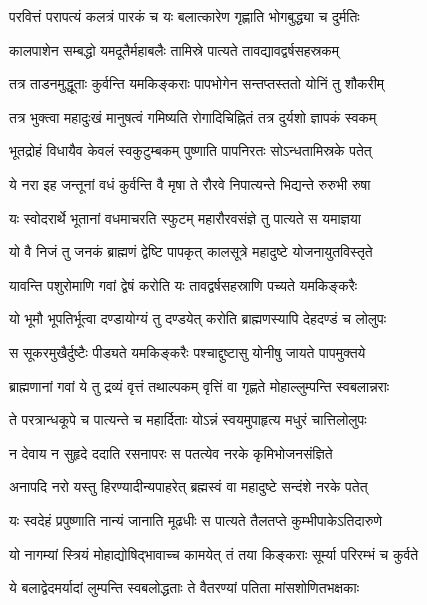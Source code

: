 \twolineshloka
{परवित्तं परापत्यं कलत्रं पारकं च यः}
{बलात्कारेण गृह्णाति भोगबुद्ध्या च दुर्मतिः}%

\twolineshloka
{कालपाशेन सम्बद्धो यमदूतैर्महाबलैः}
{तामिस्रे पात्यते तावद्यावद्वर्षसहस्रकम्}%

\twolineshloka
{तत्र ताडनमुद्धूताः कुर्वन्ति यमकिङ्कराः}
{पापभोगेन सन्तप्तस्ततो योनिं तु शौकरीम्}%

\twolineshloka
{तत्र भुक्त्वा महादुःखं मानुषत्वं गमिष्यति}
{रोगादिचिह्नितं तत्र दुर्यशो ज्ञापकं स्वकम्}%

\twolineshloka
{भूतद्रोहं विधायैव केवलं स्वकुटुम्बकम्}
{पुष्णाति पापनिरतः सोऽन्धतामिस्रके पतेत्}%

\twolineshloka
{ये नरा इह जन्तूनां वधं कुर्वन्ति वै मृषा}
{ते रौरवे निपात्यन्ते भिद्यन्ते रुरुभी रुषा}%

\twolineshloka
{यः स्वोदरार्थे भूतानां वधमाचरति स्फुटम्}
{महारौरवसंज्ञे तु पात्यते स यमाज्ञया}%

\twolineshloka
{यो वै निजं तु जनकं ब्राह्मणं द्वेष्टि पापकृत्}
{कालसूत्रे महादुष्टे योजनायुतविस्तृते}%

\twolineshloka
{यावन्ति पशुरोमाणि गवां द्वेषं करोति यः}
{तावद्वर्षसहस्राणि पच्यते यमकिङ्करैः}%

\twolineshloka
{यो भूमौ भूपतिर्भूत्वा दण्डायोग्यं तु दण्डयेत्}
{करोति ब्राह्मणस्यापि देहदण्डं च लोलुपः}%

\twolineshloka
{स सूकरमुखैर्दुष्टैः पीड्यते यमकिङ्करैः}
{पश्चाद्दुष्टासु योनीषु जायते पापमुक्तये}%

\twolineshloka
{ब्राह्मणानां गवां ये तु द्रव्यं वृत्तं तथाल्पकम्}
{वृत्तिं वा गृह्णते मोहाल्लुम्पन्ति स्वबलान्नराः}%

\twolineshloka
{ते परत्रान्धकूपे च पात्यन्ते च महार्दिताः}
{योऽन्नं स्वयमुपाहृत्य मधुरं चात्तिलोलुपः}%

\twolineshloka
{न देवाय न सुहृदे ददाति रसनापरः}
{स पतत्येव नरके कृमिभोजनसंज्ञिते}%

\twolineshloka
{अनापदि नरो यस्तु हिरण्यादीन्यपाहरेत्}
{ब्रह्मस्वं वा महादुष्टे सन्दंशे नरके पतेत्}%

\twolineshloka
{यः स्वदेहं प्रपुष्णाति नान्यं जानाति मूढधीः}
{स पात्यते तैलतप्ते कुम्भीपाकेऽतिदारुणे}%

\twolineshloka
{यो नागम्यां स्त्रियं मोहाद्योषिद्भावाच्च कामयेत्}
{तं तया किङ्कराः सूर्म्या परिरम्भं च कुर्वते}%

\twolineshloka
{ये बलाद्वेदमर्यादां लुम्पन्ति स्वबलोद्धताः}
{ते वैतरण्यां पतिता मांसशोणितभक्षकाः}%

